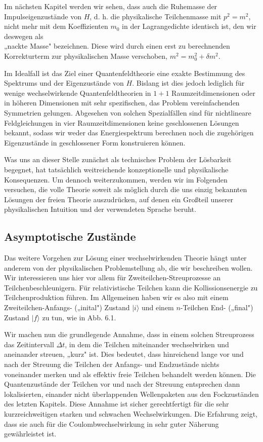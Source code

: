 \documentclass[10pt, letterpaper]{article}
\begin{document}
Im nächsten Kapitel werden wir sehen, dass auch die Ruhemasse der Impulseigenzustände von $H$, d. h. die physikalische Teilchenmasse mit $p^{2}=m^{2}$, nicht mehr mit dem Koeffizienten $m_{0}$ in der Lagrangedichte identisch ist, den wir deswegen als\\
„nackte Masse" bezeichnen. Diese wird durch einen erst zu berechnenden Korrekturterm zur physikalischen Masse verschoben, $m^{2}=m_{0}^{2}+\delta m^{2}$.

Im Idealfall ist das Ziel einer Quantenfeldtheorie eine exakte Bestimmung des Spektrums und der Eigenzustände von $H$. Bislang ist dies jedoch lediglich für wenige wechselwirkende Quantenfeldtheorien in $1+1$ Raumzeitdimensionen oder in höheren Dimensionen mit sehr spezifischen, das Problem vereinfachenden Symmetrien gelungen. Abgesehen von solchen Spezialfällen sind für nichtlineare Feldgleichungen in vier Raumzeitdimensionen keine geschlossenen Lösungen bekannt, sodass wir weder das Energiespektrum berechnen noch die zugehörigen Eigenzustände in geschlossener Form konstruieren können.

Was uns an dieser Stelle zunächst als technisches Problem der Lösbarkeit begegnet, hat tatsächlich weitreichende konzeptionelle und physikalische Konsequenzen. Um dennoch weiterzukommen, werden wir im Folgenden versuchen, die volle Theorie soweit als möglich durch die uns einzig bekannten Lösungen der freien Theorie auszudrücken, auf denen ein Großteil unserer physikalischen Intuition und der verwendeten Sprache beruht.

\subsection*{Asymptotische Zustände}
Das weitere Vorgehen zur Lösung einer wechselwirkenden Theorie hängt unter anderem von der physikalischen Problemstellung ab, die wir beschreiben wollen. Wir interessieren uns hier vor allem für Zweiteilchen-Streuprozesse an Teilchenbeschleunigern. Für relativistische Teilchen kann die Kollissionsenergie zu Teilchenproduktion führen. Im Allgemeinen haben wir es also mit einem Zweiteilchen-Anfangs- („inital") Zustand $|i\rangle$ und einem $n$-Teilchen End- („final") Zustand $|f\rangle$ zu tun, wie in Abb. 6.1.

Wir machen nun die grundlegende Annahme, dass in einem solchen Streuprozess das Zeitintervall $\Delta t$, in dem die Teilchen miteinander wechselwirken und aneinander streuen, „kurz" ist. Dies bedeutet, dass hinreichend lange vor und nach der Streuung die Teilchen der Anfangs- und Endzustände nichts voneinander merken und als effektiv freie Teilchen behandelt werden können. Die Quantenzustände der Teilchen vor und nach der Streuung entsprechen dann lokalisierten, einander nicht überlappenden Wellenpaketen aus den Fockzuständen des letzten Kapitels. Diese Annahme ist sicher gerechtfertigt für die sehr kurzreichweitigen starken und schwachen Wechselwirkungen. Die Erfahrung zeigt, dass sie auch für die Coulombwechselwirkung in sehr guter Näherung gewährleistet ist.
\end{document}
